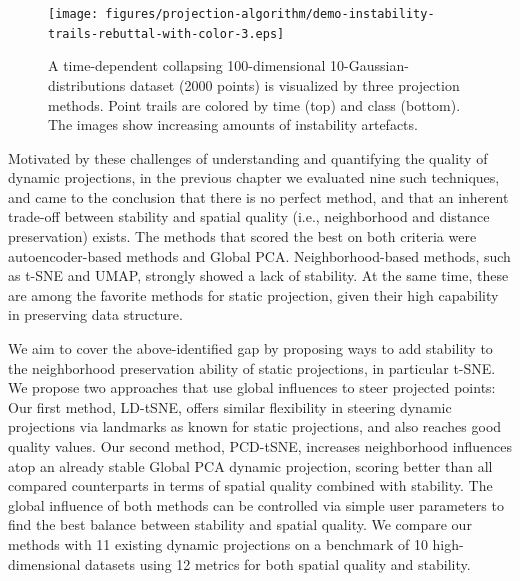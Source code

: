 
\begin{figure}[h]
 \centering
 \texttt{[image: figures/projection-algorithm/demo-instability-trails-rebuttal-with-color-3.eps]}
 \caption{A time-dependent collapsing 100-dimensional 10-Gaussian-distributions dataset (2000 points) is visualized by three projection methods. Point trails are colored by time (top) and class (bottom). The images show increasing amounts of instability artefacts.}
 \label{fig:demo-instability}
 \vspace{-0.15cm}
\end{figure}

Motivated by these challenges of understanding and quantifying the quality of dynamic projections, in the previous chapter we evaluated nine such techniques, and came to the conclusion that there is no perfect method, and that an inherent trade-off between stability and spatial quality (i.e., neighborhood and distance preservation) exists. The methods that scored the best on both criteria were autoencoder-based methods and Global PCA. Neighborhood-based methods, such as t-SNE and UMAP, strongly showed a lack of stability. At the same time, these are among the favorite methods for static projection, given their high capability in preserving data structure.

We aim to cover the above-identified gap by proposing ways to add stability to the neighborhood preservation ability of static projections, in particular t-SNE. We propose two approaches that use global influences to steer projected points:
Our first method, LD-tSNE, offers similar flexibility in steering dynamic projections via landmarks as known for static projections, and also reaches good quality values. Our second method, PCD-tSNE, increases neighborhood influences atop an already stable Global PCA dynamic projection, scoring better than all compared counterparts in terms of spatial quality combined with stability. The global influence of both methods can be controlled via simple user parameters to find the best balance between stability and spatial quality. We compare our methods with 11 existing dynamic projections on a benchmark of 10 high-dimensional datasets using 12 metrics for both spatial quality and stability. 

